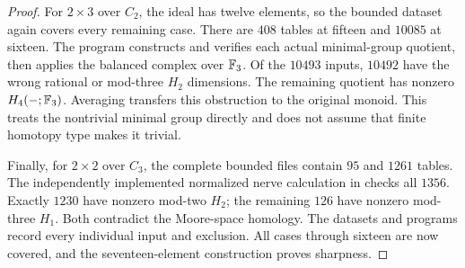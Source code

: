 \begin{proof}
For $2\times3$ over $C_2$, the ideal has twelve elements, so
the bounded dataset again covers every remaining case. There are
$408$ tables at fifteen and $10085$ at sixteen. The program
 constructs and verifies
each actual minimal-group quotient, then applies the balanced
complex over $\mathbb F_3$. Of the $10493$ inputs, $10492$ have the
wrong rational or mod-three $H_2$ dimensions. The remaining
quotient has nonzero $H_4(-;\mathbb F_3)$. Averaging transfers this
obstruction to the original monoid. This treats the nontrivial
minimal group directly and does not assume that finite homotopy
type makes it trivial.

Finally, for $2\times2$ over $C_3$, the complete bounded files
contain $95$ and $1261$ tables. The independently implemented
normalized nerve calculation in
 checks all $1356$.
Exactly $1230$ have nonzero mod-two $H_2$; the remaining $126$
have nonzero mod-three $H_1$. Both contradict the Moore-space
homology. The datasets and programs record every individual
input and exclusion. All cases through sixteen are now covered,
and the seventeen-element construction proves sharpness.
\end{proof}
